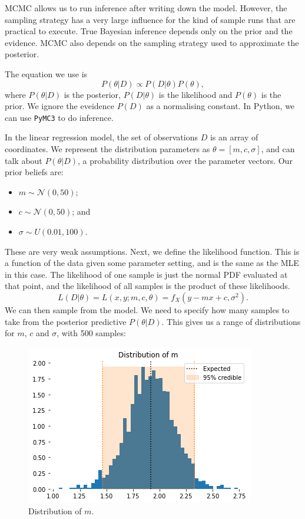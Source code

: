 \documentclass[a4paper, openany]{memoir}
\begin{document}
MCMC allows us to run inference after writing down the model. However, the sampling strategy has a very large influence for the kind of sample runs that are practical to execute. True Bayesian inference depends only on the prior and the evidence. MCMC also depends on the sampling strategy used to approximate the posterior.

The equation we use is
\[P(\theta|D) \propto P(D|\theta) P(\theta),\]
where $P(\theta|D)$ is the posterior, $P(D|\theta)$ is the likelihood and $P(\theta)$ is the prior. We ignore the eveidence $P(D)$ as a normalising constant. In Python, we can use \texttt{PyMC3} to do inference.

In the linear regression model, the set of observations $D$ is an array of coordinates. We represent the distribution parameters as $\theta = [m, c, \sigma]$, and can talk about $P(\theta|D)$, a probability distribution over the parameter vectors. Our prior beliefs are:
\begin{itemize}
    \item $m \sim \mathcal{N}(0, 50)$;
    \item $c \sim \mathcal{N}(0, 50)$; and
    \item $\sigma \sim U(0.01, 100)$.
\end{itemize}
These are very weak assumptions. Next, we define the likelihood function. This is a function of the data given some parameter setting, and is the same as the MLE in this case. The likelihood of one sample is just the normal PDF evaluated at that point, and the likelihood of all samples is the product of these likelihoods.
\[L(D|\theta) = L(x, y; m, c, \theta) = f_X(y - mx + c, \sigma^2).\]
We can then sample from the model. We need to specify how many samples to take from the posterior predictive $P(\theta|D)$. This gives us a range of distributions for $m$, $c$ and $\sigma$, with 500 samples:
\begin{figure}[H]
    \centering
    \includegraphics[scale=0.5]{src/5.32 distribution of m.png}
    \caption{Distribution of $m$.}
\end{figure}
\end{document}
